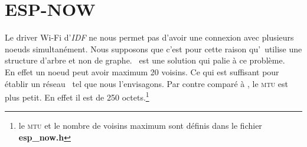     \section{ESP-NOW}
        Le driver Wi-Fi d'\textit{IDF} ne nous permet pas d'avoir une connexion avec plusieurs noeuds simultanément. 
        Nous supposons que c'est pour cette raison qu'\espmesh\ utilise une structure d'arbre et non de graphe.
        \espnow\ est une solution qui palie à ce problème.\\
        En effet un noeud peut avoir maximum 20 voisins. Ce qui est suffisant pour établir un réseau \mesh\ tel
        que nous l'envisagons. Par contre comparé à \espmesh, le \textsc{mtu} est plus petit. En effet il est
        de 250 octets.\footnote{le \textsc{mtu} et le nombre de voisins maximum sont définis dans le fichier
        \textbf{esp\_now.h}}

